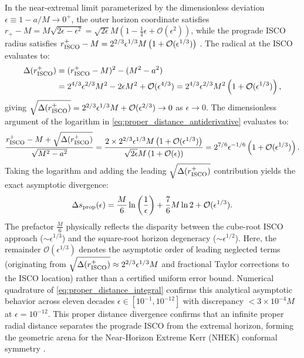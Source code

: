 In the near-extremal limit parameterized by the dimensionless deviation $\epsilon \equiv 1 - a/M \to 0^+$, the outer horizon coordinate satisfies $r_+ - M = M\sqrt{2\epsilon - \epsilon^2} = \sqrt{2\epsilon}M\left(1 - \frac{1}{4}\epsilon + \mathcal{O}(\epsilon^2)\right)$, while the prograde ISCO radius satisfies $r_{\rm ISCO}^+ - M = 2^{2/3}\epsilon^{1/3}M\left(1 + \mathcal{O}(\epsilon^{1/3})\right)$ \cite{BardeenPressTeukolsky1972}. The radical at the ISCO evaluates to:
\begin{align}
    \Delta(r_{\rm ISCO}^+) &= (r_{\rm ISCO}^+ - M)^2 - (M^2 - a^2) \nonumber \\
    &= 2^{4/3}\epsilon^{2/3}M^2 - 2\epsilon M^2 + \mathcal{O}(\epsilon^{4/3}) = 2^{4/3}\epsilon^{2/3}M^2 \left(1 + \mathcal{O}(\epsilon^{1/3})\right),
\end{align}
giving $\sqrt{\Delta(r_{\rm ISCO}^+)} = 2^{2/3}\epsilon^{1/3}M + \mathcal{O}(\epsilon^{2/3}) \to 0$ as $\epsilon \to 0$. The dimensionless argument of the logarithm in \eqref{eq:proper_distance_antiderivative} evaluates to:
\begin{equation}
    \frac{r_{\rm ISCO}^+ - M + \sqrt{\Delta(r_{\rm ISCO}^+)}}{\sqrt{M^2 - a^2}} = \frac{2 \times 2^{2/3}\epsilon^{1/3}M \left(1 + \mathcal{O}(\epsilon^{1/3})\right)}{\sqrt{2\epsilon}M \left(1 + \mathcal{O}(\epsilon)\right)} = 2^{7/6} \epsilon^{-1/6} \left(1 + \mathcal{O}(\epsilon^{1/3})\right).
\end{equation}
Taking the logarithm and adding the leading $\sqrt{\Delta(r_{\rm ISCO}^+)}$ contribution yields the exact asymptotic divergence:
\begin{equation}
    \Delta s_{\rm prop}(\epsilon) = \frac{M}{6} \ln\left(\frac{1}{\epsilon}\right) + \frac{7}{6}M \ln 2 + \mathcal{O}(\epsilon^{1/3}).
    \label{eq:proper_distance_divergence}
\end{equation}
The prefactor $\frac{M}{6}$ physically reflects the disparity between the cube-root ISCO approach ($\sim \epsilon^{1/3}$) and the square-root horizon degeneracy ($\sim \epsilon^{1/2}$). Here, the remainder $\mathcal{O}(\epsilon^{1/3})$ denotes the asymptotic order of leading neglected terms (originating from $\sqrt{\Delta(r_{\rm ISCO}^+)} \approx 2^{2/3}\epsilon^{1/3}M$ and fractional Taylor corrections to the ISCO location) rather than a certified uniform error bound. Numerical quadrature of \eqref{eq:proper_distance_integral} confirms this analytical asymptotic behavior across eleven decades $\epsilon \in [10^{-1}, 10^{-12}]$ with discrepancy $< 3 \times 10^{-4}M$ at $\epsilon = 10^{-12}$. This proper distance divergence confirms that an infinite proper radial distance separates the prograde ISCO from the extremal horizon, forming the geometric arena for the Near-Horizon Extreme Kerr (NHEK) conformal symmetry \cite{BardeenPressTeukolsky1972}.
